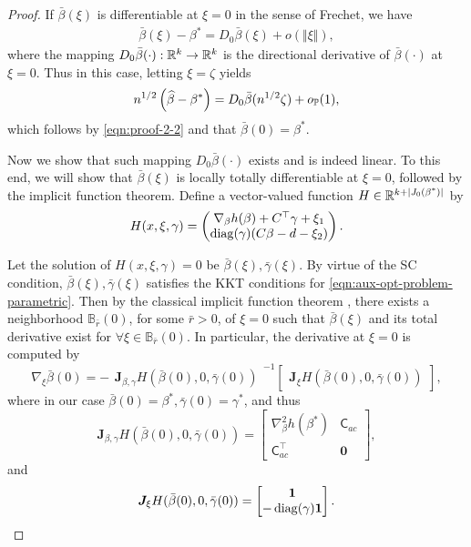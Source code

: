 \begin{proof}
If $\bar{\beta}(\xi)$ is differentiable at $\xi=0$ in the sense of Frechet, we have
\begin{align*}
    \bar{\beta}(\xi) - \beta^* = D_0\bar{\beta}(\xi) + o(\Vert\xi\Vert),
\end{align*}
where the mapping $D_0\bar{\beta}(\cdot): \mathbb{R}^k \rightarrow \mathbb{R}^k$ is the directional derivative of $\bar{\beta}(\cdot)$ at $\xi=0$. Thus in this case, letting $\xi = \zeta$ yields
\begin{align*}
    n^{1/2}\left(\widehat{\beta} - \beta^* \right) = D_0\bar{\beta}(n^{1/2}\zeta) + o_{\mathbb{P}}(1),
\end{align*}
which follows by \eqref{eqn:proof-2-2} and that $\bar{\beta}(0) = \beta^*$.

Now we show that such mapping $D_0\bar{\beta}(\cdot)$ exists and is indeed linear. To this end, we will show that $\bar{\beta}(\xi)$ is locally totally differentiable at $\xi = 0$, followed by the implicit function theorem. Define a vector-valued function $H \in \mathbb{R}^{k+\vert J_0(\beta^*) \vert}$ by 
\[
H(x, \xi, \gamma) = \begin{pmatrix}
\nabla_\beta h(\beta) + C^\top\gamma + \xi_1 \\
\operatorname{diag}(\gamma)(C\beta - d - \xi_2)
\end{pmatrix}.
\] 

Let the solution of $H(x, \xi, \gamma)=0$ be $\bar{\beta}(\xi), \bar{\gamma}(\xi)$.
By virtue of the SC condition, $\bar{\beta}(\xi), \bar{\gamma}(\xi)$ satisfies the KKT conditions for \eqref{eqn:aux-opt-problem-parametric}. Then by the classical implicit function theorem \citep[e.g.,][Theorem 1B.1]{dontchev2009implicit}, there exists a neighborhood $\mathbb{B}_{\bar{r}}(0)$, for some $\bar{r}>0$, of $\xi = 0$ such that $\bar{\beta}(\xi)$ and its total derivative exist for $\forall \xi \in \mathbb{B}_{\bar{r}}(0)$. In particular, the derivative at $\xi=0$ is computed by
\[
\nabla_\xi \bar{\beta}(0) = - \begin{matrix}
\bm{J}_{\beta,\gamma} H(\bar{\beta}(0), 0, \bar{\gamma}(0))
\end{matrix}^{-1}
\begin{bmatrix}
\bm{J}_{\xi} H(\bar{\beta}(0), 0, \bar{\gamma}(0))
\end{bmatrix},
\]
where in our case $\bar{\beta}(0) = \beta^*, \bar{\gamma}(0) = \gamma^*$, and thus
\[
\bm{J}_{\beta,\gamma} H(\bar{\beta}(0), 0, \bar{\gamma}(0)) = \begin{bmatrix}
        \nabla^2_{\beta}h(\beta^*) & \mathsf{C}_{ac} \\
        \mathsf{C}^\top_{ac} & \bm{0}
        \end{bmatrix},
\]
and
\[
\bm{J}_{\xi} H(\bar{\beta}(0), 0, \bar{\gamma}(0)) = \begin{bmatrix}
        \bm{1} \\
        -\operatorname{diag}(\gamma)\bm{1}
        \end{bmatrix}.
\]


\end{proof}
